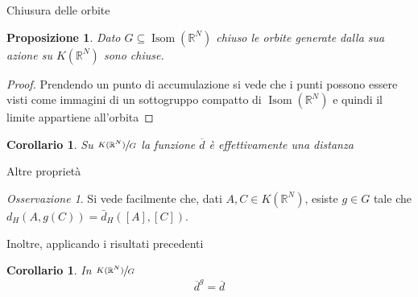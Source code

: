 \documentclass{beamer}
\newcounter{counter1}
\theoremstyle{plain}
\newtheorem{mypro}[counter1]{Proposizione}
\newtheorem{mycor}[counter1]{Corollario}
\theoremstyle{definition}
\theoremstyle{remark}
\newtheorem{myoss}[counter1]{Osservazione}
\newcommand{\obar}[1]{\overline{#1}}
\newcommand{\pa}[1]{\left(#1\right)}
\newcommand{\bra}[1]{\left[#1\right]}
\DeclareMathOperator{\isom}{Isom}
\begin{document}
\begin{frame}{Chiusura delle orbite}
  \begin{mypro}
    Dato $G \subseteq \isom(\mathbb{R}^N)$ chiuso le orbite generate
    dalla sua azione su $K(\mathbb{R}^N)$ sono chiuse.
  \end{mypro}
  \begin{proof}
    Prendendo un punto di accumulazione si vede che i punti possono
    essere visti come immagini di un sottogruppo compatto di $\isom
    (\mathbb{R}^N)$ e quindi il limite appartiene all'orbita
  \end{proof}
  \begin{mycor}
    Su $\sfrac{K(\mathbb{R}^N)}{G}$ la funzione $\obar d$ è
    effettivamente una distanza
  \end{mycor}
\end{frame}

\begin{frame}{Altre proprietà}
  \begin{myoss}
    Si vede facilmente che, dati $A,C \in K(\mathbb{R}^N)$, esiste $g
    \in G$ tale che $d_H \pa{A, g(C)} = \bar d _H \pa{ \bra{A},
      \bra{C}}$.
  \end{myoss}
  Inoltre, applicando i risultati precedenti
  \begin{mycor}
    In $\sfrac{K(\mathbb{R}^N)}{G}$ 
    \[ \obar{d} ^g = \obar{d} \]
  \end{mycor}
\end{frame}
\end{document}
